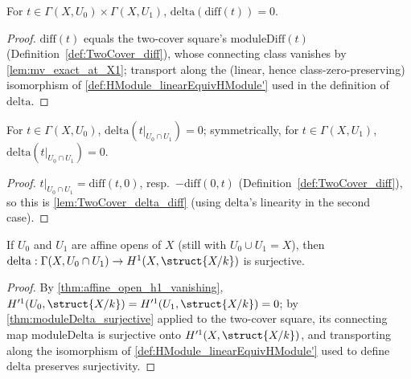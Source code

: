 \begin{lemma}
  \label{lem:TwoCover_delta_diff}
  \leanok
  For \(t \in \Gamma(X,U_0) \times \Gamma(X,U_1)\), \(\mathrm{delta}(\mathrm{diff}(t)) = 0\).
\end{lemma}
\begin{proof}
  \leanok
  \(\mathrm{diff}(t)\) equals the two-cover square's \(\mathrm{moduleDiff}(t)\)
  (Definition~\ref{def:TwoCover_diff}), whose connecting class vanishes by
  \ref{lem:mv_exact_at_X1}; transport along the (linear, hence class-zero-preserving)
  isomorphism of \ref{def:HModule_linearEquivHModule'} used in the definition of
  \(\mathrm{delta}\).
\end{proof}

\begin{lemma}
  \label{lem:TwoCover_delta_resHom}
  \leanok
  For \(t \in \Gamma(X,U_0)\), \(\mathrm{delta}(t|_{U_0 \cap U_1}) = 0\); symmetrically, for
  \(t \in \Gamma(X,U_1)\), \(\mathrm{delta}(t|_{U_0 \cap U_1}) = 0\).
\end{lemma}
\begin{proof}
  \leanok
  \(t|_{U_0 \cap U_1} = \mathrm{diff}(t,0)\), resp.\ \(-\mathrm{diff}(0,t)\)
  (Definition~\ref{def:TwoCover_diff}), so this is \ref{lem:TwoCover_delta_diff} (using
  \(\mathrm{delta}\)'s linearity in the second case).
\end{proof}

\begin{theorem}
  \label{thm:TwoCover_delta_surjective}
  \leanok
  If \(U_0\) and \(U_1\) are affine opens of \(X\) (still with \(U_0 \cup U_1 = X\)), then
  \(\mathrm{delta} : \Gamma(X, U_0 \cap U_1) \to H^1(X,\struct{X/k})\) is surjective.
\end{theorem}
\begin{proof}
  \leanok
  By \ref{thm:affine_open_h1_vanishing}, \(H'^1(U_0,\struct{X/k}) = H'^1(U_1,\struct{X/k}) = 0\);
  by \ref{thm:moduleDelta_surjective} applied to the two-cover square, its connecting map
  \(\mathrm{moduleDelta}\) is surjective onto \(H'^1(X,\struct{X/k})\), and transporting
  along the isomorphism of \ref{def:HModule_linearEquivHModule'} used to define
  \(\mathrm{delta}\) preserves surjectivity.
\end{proof}

